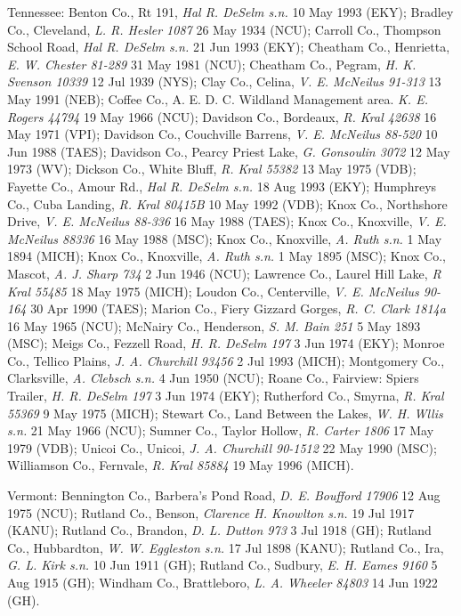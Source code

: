 \documentclass{article}
\begin{document}
Tennessee:
Benton Co., Rt 191, \textit{Hal R. DeSelm s.n.} 10 May 1993 (EKY);
Bradley Co., Cleveland, \textit{L. R. Hesler 1087} 26 May 1934 (NCU);
Carroll Co., Thompson School Road, \textit{Hal R. DeSelm s.n.} 21 Jun 1993 (EKY);
Cheatham Co., Henrietta, \textit{E. W. Chester 81-289} 31 May 1981 (NCU);
Cheatham Co., Pegram, \textit{H. K. Svenson 10339} 12 Jul 1939 (NYS);
Clay Co., Celina, \textit{V. E. McNeilus 91-313} 13 May 1991 (NEB);
Coffee Co., A. E. D. C. Wildland Management area. \textit{K. E. Rogers 44794} 19 May 1966 (NCU);
Davidson Co., Bordeaux, \textit{R. Kral 42638} 16 May 1971 (VPI);
Davidson Co., Couchville Barrens, \textit{V. E. McNeilus 88-520} 10 Jun 1988 (TAES);
Davidson Co., Pearcy Priest Lake, \textit{G. Gonsoulin 3072} 12 May 1973 (WV);
Dickson Co.,  White Bluff, \textit{R. Kral 55382} 13 May 1975 (VDB);
Fayette Co., Amour Rd., \textit{Hal R. DeSelm s.n.} 18 Aug 1993 (EKY);
Humphreys Co., Cuba Landing, \textit{R. Kral 80415B} 10 May 1992 (VDB);
Knox Co., Northshore Drive, \textit{V. E. McNeilus 88-336} 16 May 1988 (TAES);
Knox Co., Knoxville, \textit{V. E. McNeilus 88336} 16 May 1988 (MSC);
Knox Co., Knoxville, \textit{A. Ruth s.n.} 1 May 1894 (MICH);
Knox Co., Knoxville, \textit{A. Ruth s.n.} 1 May 1895 (MSC);
Knox Co., Mascot, \textit{A. J. Sharp 734} 2 Jun 1946 (NCU);
Lawrence Co., Laurel Hill Lake, \textit{R Kral 55485} 18 May 1975 (MICH);
Loudon Co., Centerville, \textit{V. E. McNeilus 90-164} 30 Apr 1990 (TAES);
Marion Co., Fiery Gizzard Gorges, \textit{R. C. Clark 1814a} 16 May 1965 (NCU);
McNairy Co., Henderson, \textit{S. M. Bain 251} 5 May 1893 (MSC);
Meigs Co., Fezzell Road, \textit{H. R. DeSelm 197} 3 Jun 1974 (EKY);
Monroe Co., Tellico Plains, \textit{J. A. Churchill 93456} 2 Jul 1993 (MICH);
Montgomery Co., Clarksville, \textit{A. Clebsch s.n.} 4 Jun 1950 (NCU);
Roane Co., Fairview: Spiers Trailer, \textit{H. R. DeSelm 197} 3 Jun 1974 (EKY);
Rutherford Co., Smyrna, \textit{R. Kral 55369} 9 May 1975 (MICH);
Stewart Co., Land Between the Lakes, \textit{W. H. Wllis s.n.} 21 May 1966 (NCU);
Sumner Co., Taylor Hollow, \textit{R. Carter 1806} 17 May 1979 (VDB);
Unicoi Co., Unicoi, \textit{J. A. Churchill 90-1512} 22 May 1990 (MSC);
Williamson Co., Fernvale, \textit{R. Kral 85884} 19 May 1996 (MICH).

Vermont:
Bennington Co., Barbera's Pond Road, \textit{D. E. Boufford 17906} 12 Aug 1975 (NCU);
Rutland Co., Benson, \textit{Clarence H. Knowlton s.n.} 19 Jul 1917 (KANU);
Rutland Co., Brandon, \textit{D. L. Dutton 973} 3 Jul 1918 (GH);
Rutland Co., Hubbardton, \textit{W. W. Eggleston s.n.} 17 Jul 1898 (KANU);
Rutland Co., Ira, \textit{G. L. Kirk s.n.} 10 Jun 1911 (GH);
Rutland Co., Sudbury, \textit{E. H. Eames 9160} 5 Aug 1915 (GH);
Windham Co., Brattleboro, \textit{L. A. Wheeler 84803} 14 Jun 1922 (GH).
\end{document}
